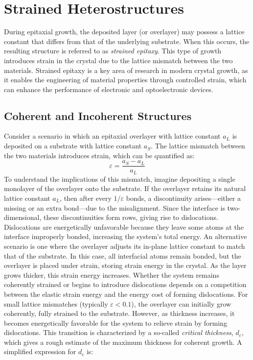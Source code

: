\section{Strained Heterostructures}
During epitaxial growth, the deposited layer (or overlayer) may possess a lattice constant that differs from that of the underlying substrate. When this occurs, the resulting structure is referred to as \textit{strained epitaxy}. This type of growth introduces strain in the crystal due to the lattice mismatch between the two materials. Strained epitaxy is a key area of research in modern crystal growth, as it enables the engineering of material properties through controlled strain, which can enhance the performance of electronic and optoelectronic devices.

\subsection{Coherent and Incoherent Structures}
Consider a scenario in which an epitaxial overlayer with lattice constant $a_L$ is deposited on a substrate with lattice constant $a_S$. The lattice mismatch between the two materials introduces strain, which can be quantified as:
\begin{equation*}
	\varepsilon = \frac{a_S - a_L}{a_L}
\end{equation*}
To understand the implications of this mismatch, imagine depositing a single monolayer of the overlayer onto the substrate. If the overlayer retains its natural lattice constant $a_L$, then after every $1/\varepsilon$ bonds, a discontinuity arises—either a missing or an extra bond—due to the misalignment. Since the interface is two-dimensional, these discontinuities form rows, giving rise to dislocations. Dislocations are energetically unfavorable because they leave some atoms at the interface improperly bonded, increasing the system’s total energy.
An alternative scenario is one where the overlayer adjusts its in-plane lattice constant to match that of the substrate. In this case, all interfacial atoms remain bonded, but the overlayer is placed under strain, storing strain energy in the crystal. As the layer grows thicker, this strain energy increases. Whether the system remains coherently strained or begins to introduce dislocations depends on a competition between the elastic strain energy and the energy cost of forming dislocations.
For small lattice mismatches (typically $\varepsilon < 0.1$), the overlayer can initially grow coherently, fully strained to the substrate. However, as thickness increases, it becomes energetically favorable for the system to relieve strain by forming dislocations. This transition is characterized by a so-called \textit{critical thickness}, $d_c$, which gives a rough estimate of the maximum thickness for coherent growth. A simplified expression for $d_c$ is:
